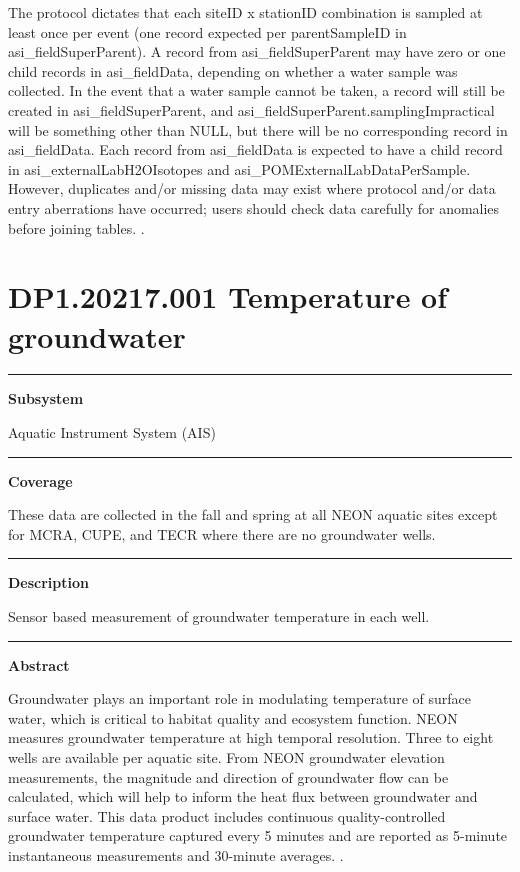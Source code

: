 \documentclass[]{article}
\begin{document}
The protocol dictates that each siteID x stationID combination is
sampled at least once per event (one record expected per parentSampleID
in asi\_fieldSuperParent). A record from asi\_fieldSuperParent may have
zero or one child records in asi\_fieldData, depending on whether a
water sample was collected. In the event that a water sample cannot be
taken, a record will still be created in asi\_fieldSuperParent, and
asi\_fieldSuperParent.samplingImpractical will be something other than
NULL, but there will be no corresponding record in asi\_fieldData. Each
record from asi\_fieldData is expected to have a child record in
asi\_externalLabH2OIsotopes and asi\_POMExternalLabDataPerSample.
However, duplicates and/or missing data may exist where protocol and/or
data entry aberrations have occurred; users should check data carefully
for anomalies before joining tables. \newpage
.

\section{DP1.20217.001 Temperature of
groundwater}\label{dp1.20217.001-temperature-of-groundwater}

\begin{center}\rule{0.5\linewidth}{\linethickness}\end{center}

\textbf{Subsystem}

Aquatic Instrument System (AIS)

\begin{center}\rule{0.5\linewidth}{\linethickness}\end{center}

\textbf{Coverage}

These data are collected in the fall and spring at all NEON aquatic
sites except for MCRA, CUPE, and TECR where there are no groundwater
wells.

\begin{center}\rule{0.5\linewidth}{\linethickness}\end{center}

\textbf{Description}

Sensor based measurement of groundwater temperature in each well.

\begin{center}\rule{0.5\linewidth}{\linethickness}\end{center}

\textbf{Abstract}

Groundwater plays an important role in modulating temperature of surface
water, which is critical to habitat quality and ecosystem function. NEON
measures groundwater temperature at high temporal resolution. Three to
eight wells are available per aquatic site. From NEON groundwater
elevation measurements, the magnitude and direction of groundwater flow
can be calculated, which will help to inform the heat flux between
groundwater and surface water. This data product includes continuous
quality-controlled groundwater temperature captured every 5 minutes and
are reported as 5-minute instantaneous measurements and 30-minute
averages. \newpage
.
\end{document}
